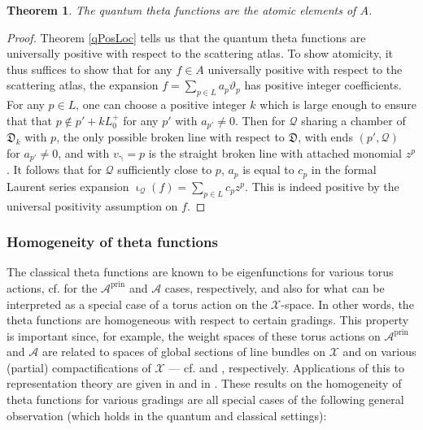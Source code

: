 \documentclass{amsart}
\DeclareMathOperator{\prin}{prin}
\let\f=\mathfrak
\let\s=\mathcal
\newcommand {\sQ} {\mathcal{Q}}
\renewcommand{\iota}{\upiota}
\renewcommand{\gamma}{\upgamma}
\theoremstyle{plain}%
\newtheorem{thm}{Theorem}[section]
\theoremstyle{definition}
\theoremstyle{remark}
\begin{document}
\begin{thm}\label{qAtomic}
The quantum theta functions are the atomic elements of $A$. 
\end{thm}
\begin{proof}
Theorem \ref{qPosLoc} tells us that the quantum theta functions are universally positive with respect to the scattering atlas.  To show atomicity, it thus suffices to show that for any $f\in A$ universally positive with respect to the scattering atlas, the expansion $f=\sum_{p\in L} a_p \vartheta_p$ has positive integer coefficients.  For any $p\in L$, one can choose a positive integer $k$ which is large enough to ensure that that $p\notin p'+kL_0^+$ for any $p'$ with $a_{p'}\neq 0$.  Then for $\sQ$ sharing a chamber of $\f{D}_k$ with $p$, the only possible broken line with respect to $\f{D}$, with ends $(p',\sQ)$ for $a_{p'}\neq 0$, and with $v_{\gamma}=p$ is the straight broken line with attached monomial $z^p$.   
It follows that for $\sQ$ sufficiently close to $p$, $a_p$ is equal to $c_p$ in the formal Laurent series expansion $\iota_{\sQ}(f)=\sum_{p\in L} c_p z^p$.  This is indeed positive by the universal positivity assumption on $f$.
\end{proof}



\subsubsection{Homogeneity of theta functions}

The classical theta functions are known to be eigenfunctions for various torus actions, cf. \cite[Prop. 7.7 and Prop. 7.19]{GHKK} for the $\s{A}^{\prin}$ and $\s{A}$ cases, respectively, and also \cite[Thm. 5.2]{GHK1} for what can be interpreted as a special case of a torus action on the $\s{X}$-space.  In other words, the theta functions are homogeneous with respect to certain gradings.  This property is important since, for example, the weight spaces of these torus actions on $\s{A}^{\prin}$ and $\s{A}$ are related to spaces of global sections of line bundles on $\s{X}$ and on various (partial) compactifications of $\s{X}$ --- cf. \cite[\S 4]{GHK3} and \cite{ManCox}, respectively.  Applications of this to representation theory are given in \cite[\S 0.4]{GHKK} and in \cite{MageeFG,MageeGHK}.  These results on the homogeneity of theta functions for various gradings are all special cases of the following general observation (which holds in the quantum and classical settings):
\end{document}
